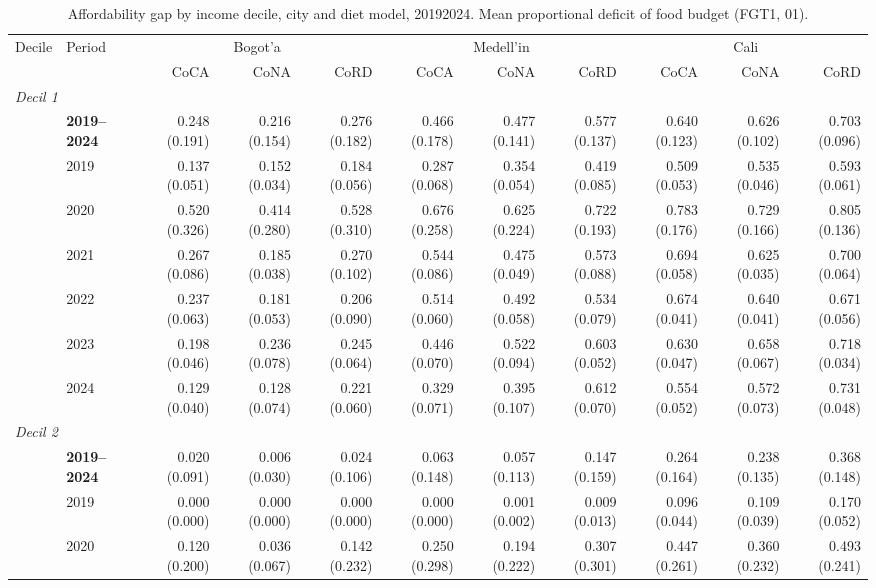 \begin{table}[htbp]
\centering\small\setlength{\tabcolsep}{3pt}
\caption{Affordability gap by income decile, city and diet model, 2019\textendash{}2024. Mean proportional deficit of food budget (FGT1, 0\textendash{}1).}
\label{tab:afford_gap}
\begin{tabular}{llrrrrrrrrr}
\toprule
Decile & Period & \multicolumn{3}{c}{Bogot'{a}} & \multicolumn{3}{c}{Medell'{i}n} & \multicolumn{3}{c}{Cali} \\
 & & CoCA & CoNA & CoRD & CoCA & CoNA & CoRD & CoCA & CoNA & CoRD \\
\midrule
\multicolumn{11}{l}{\textit{Decil 1}} \\
 & \textbf{2019–2024} & 0.248 (0.191) & 0.216 (0.154) & 0.276 (0.182) & 0.466 (0.178) & 0.477 (0.141) & 0.577 (0.137) & 0.640 (0.123) & 0.626 (0.102) & 0.703 (0.096) \\
 & 2019 & 0.137 (0.051) & 0.152 (0.034) & 0.184 (0.056) & 0.287 (0.068) & 0.354 (0.054) & 0.419 (0.085) & 0.509 (0.053) & 0.535 (0.046) & 0.593 (0.061) \\
 & 2020 & 0.520 (0.326) & 0.414 (0.280) & 0.528 (0.310) & 0.676 (0.258) & 0.625 (0.224) & 0.722 (0.193) & 0.783 (0.176) & 0.729 (0.166) & 0.805 (0.136) \\
 & 2021 & 0.267 (0.086) & 0.185 (0.038) & 0.270 (0.102) & 0.544 (0.086) & 0.475 (0.049) & 0.573 (0.088) & 0.694 (0.058) & 0.625 (0.035) & 0.700 (0.064) \\
 & 2022 & 0.237 (0.063) & 0.181 (0.053) & 0.206 (0.090) & 0.514 (0.060) & 0.492 (0.058) & 0.534 (0.079) & 0.674 (0.041) & 0.640 (0.041) & 0.671 (0.056) \\
 & 2023 & 0.198 (0.046) & 0.236 (0.078) & 0.245 (0.064) & 0.446 (0.070) & 0.522 (0.094) & 0.603 (0.052) & 0.630 (0.047) & 0.658 (0.067) & 0.718 (0.034) \\
 & 2024 & 0.129 (0.040) & 0.128 (0.074) & 0.221 (0.060) & 0.329 (0.071) & 0.395 (0.107) & 0.612 (0.070) & 0.554 (0.052) & 0.572 (0.073) & 0.731 (0.048) \\
\midrule
\multicolumn{11}{l}{\textit{Decil 2}} \\
 & \textbf{2019–2024} & 0.020 (0.091) & 0.006 (0.030) & 0.024 (0.106) & 0.063 (0.148) & 0.057 (0.113) & 0.147 (0.159) & 0.264 (0.164) & 0.238 (0.135) & 0.368 (0.148) \\
 & 2019 & 0.000 (0.000) & 0.000 (0.000) & 0.000 (0.000) & 0.000 (0.000) & 0.001 (0.002) & 0.009 (0.013) & 0.096 (0.044) & 0.109 (0.039) & 0.170 (0.052) \\
 & 2020 & 0.120 (0.200) & 0.036 (0.067) & 0.142 (0.232) & 0.250 (0.298) & 0.194 (0.222) & 0.307 (0.301) & 0.447 (0.261) & 0.360 (0.232) & 0.493 (0.241) \\

\end{tabular}
\end{table}
